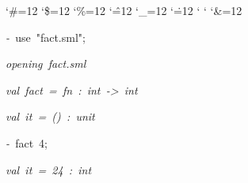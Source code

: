 \begin{list}{}
{\setlength{\leftmargin}{\leftmargini}
\setlength{\rightmargin}{0cm}
\setlength{\itemindent}{0cm}
\setlength{\listparindent}{0cm}
\setlength{\itemsep}{0cm}
\setlength{\parsep}{0cm}
\setlength{\labelsep}{0cm}
\setlength{\labelwidth}{0cm}
\catcode`\#=12
\catcode`\$=12
\catcode`\%=12
\catcode`\^=12
\catcode`\_=12
\catcode`\.=12
\catcode`
\catcode`
\catcode`\&=12
\ttfamily}
\small
\item[]\textsl{-\ }use\ "fact.sml";
\item[]\textsl{opening\ fact.sml}
\item[]\textsl{val\ fact\ =\ fn\ :\ int\ ->\ int}
\item[]\textsl{val\ it\ =\ ()\ :\ unit}
\item[]\textsl{-\ }fact\ 4;
\item[]\textsl{val\ it\ =\ 24\ :\ int}
\end{list}

